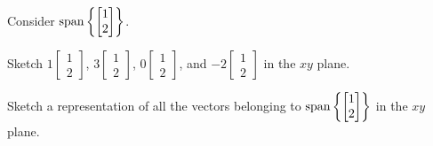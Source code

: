 \begin{applicationActivities}
\begin{activity}{10}
  Consider \(\operatorname{span}\left\{\begin{bmatrix}1\\2\end{bmatrix}\right\}\).
  \begin{subactivity}
    Sketch
    \(1\begin{bmatrix}1\\2\end{bmatrix}\),
    \(3\begin{bmatrix}1\\2\end{bmatrix}\),
    \(0\begin{bmatrix}1\\2\end{bmatrix}\),
    and \(-2\begin{bmatrix}1\\2\end{bmatrix}\) in the \(xy\) plane.
  \end{subactivity}
  \begin{subactivity}
    Sketch a representation of all the vectors belonging to
    \(\operatorname{span}\left\{\begin{bmatrix}1\\2\end{bmatrix}\right\}\)
    in the \(xy\) plane.
  \end{subactivity}
\end{activity}






\end{applicationActivities}
